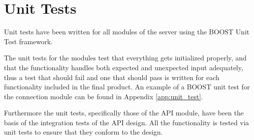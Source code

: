 \section{Unit Tests}
Unit tests have been written for all modules of the server using the BOOST Unit Test framework. 

The unit tests for the modules test that everything gets initialized properly, and that the functionality handles both expected and unexpected input adequately, thus a test that should fail and one that should pass is written for each functionality included in the final product. An example of a BOOST unit test for the connection module can be found in Appendix \autoref{app:unit_test}.

Furthermore the unit tests, specifically those of the API module, have been the basis of the integration tests of the API design. All the functionality is tested via unit tests to ensure that they conform to the design.

